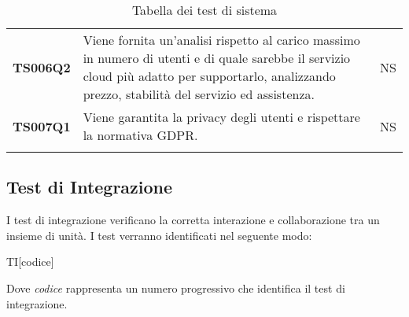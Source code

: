 \documentclass[../piano-di-qualifica.tex]{subfiles}
\begin{document}
\begin{centering}
\begin{longtable}[H]{>{\centering\bfseries}m{3cm} >{}p{10cm} >{\centering\arraybackslash}m{3cm}}
    TS006Q2            & Viene fornita un’analisi rispetto al carico massimo in numero di utenti e di quale sarebbe il servizio cloud più adatto per supportarlo, analizzando prezzo, stabilità del servizio ed assistenza. \newline
                       & NS                                                                                                                                                                                                                                                               \\

    TS007Q1            & Viene garantita la privacy degli utenti e rispettare la normativa GDPR\@. \newline
                       & NS                                                                                                                                                                                                                                                               \\

    \rowcolor{white}
    \caption{Tabella dei test di sistema}%
    \label{tab:test_sistema}
  \end{longtable}
\end{centering}

\subsection{Test di Integrazione}%
\label{subs:test_di_integrazione}

I test di integrazione verificano la corretta interazione e collaborazione tra un insieme di unità. I test verranno identificati nel seguente modo:
\begin{center}
  TI[codice]
\end{center}

Dove \textit{codice} rappresenta un numero progressivo che identifica il test di integrazione.
\end{document}
